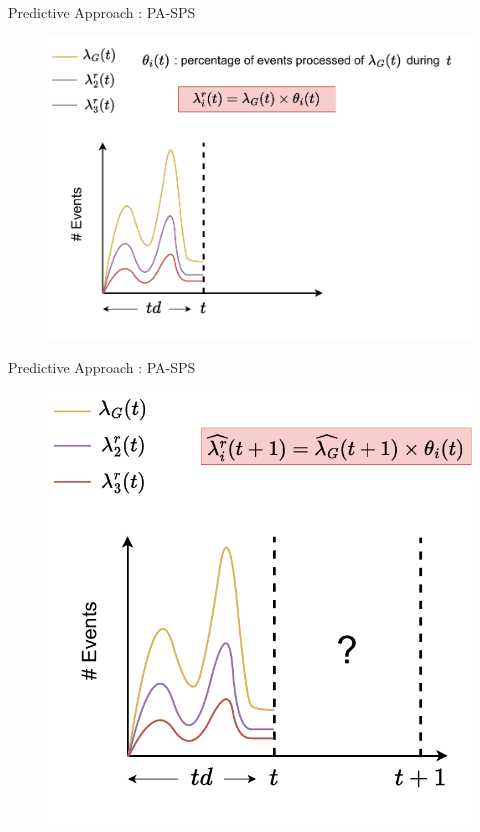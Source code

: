 \begin{frame}{Predictive Approach : PA-SPS}
\begin{figure}
    \centering
    \includegraphics[scale=0.63]{images/concepts/predictive/PA-SPS-Prediction-6.pdf}
\end{figure}
\end{frame}

\begin{frame}{Predictive Approach : PA-SPS}
\begin{figure}
    \centering
    \includegraphics[scale=0.63]{images/concepts/predictive/PA-SPS-Prediction-7.pdf}
\end{figure}
\end{frame}

